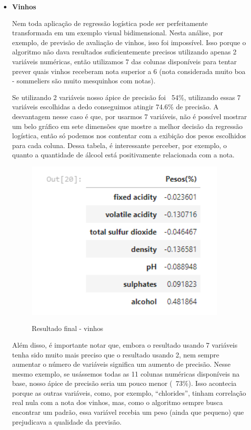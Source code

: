\documentclass[12pt]{article}
\begin{document}
\begin{itemize}
    \item \textbf{Vinhos}
    
    \hspace{0.4cm}Nem toda aplicação de regressão logística pode ser perfeitamente transformada em um exemplo visual bidimensional. Nesta análise, por exemplo, de previsão de avaliação de vinhos, isso foi impossível. Isso porque o algoritmo não dava resultados suficientemente precisos utilizando apenas 2 variáveis numéricas, então utilizamos 7 das colunas disponíveis para tentar prever quais vinhos receberam nota superior a 6 (nota considerada muito boa - sommeliers são muito mesquinhos com notas).

    \hspace{0.4cm}Se utilizando 2 variáveis nosso ápice de precisão foi ~54\%, utilizando essas 7 variáveis escolhidas a dedo conseguimos atingir 74.6\% de precisão. A desvantagem nesse caso é que, por usarmos 7 variáveis, não é possível mostrar um belo gráfico em sete dimensões que mostre a melhor decisão da regressão logística, então só podemos nos contentar com a exibição dos pesos escolhidos para cada coluna. Dessa tabela, é interessante perceber, por exemplo, o quanto a quantidade de álcool está positivamente relacionada com a nota.

    \begin{figure}[h]
    \caption{Resultado final - vinhos}
    \centering
    \includegraphics[width=10cm]{out3.png}
    \label{figura:out4}
    \end{figure}
    
    \hspace{0.4cm}Além disso, é importante notar que, embora o resultado usando 7 variáveis tenha sido muito mais preciso que o resultado usando 2, nem sempre aumentar o número de variáveis significa um aumento de precisão. Nesse mesmo exemplo, se usássemos todas as 11 colunas numéricas disponíveis na base, nosso ápice de precisão seria um pouco menor (~73\%). Isso acontecia porque as outras variáveis, como, por exemplo, “chlorides”, tinham correlação real nula com a nota dos vinhos, mas, como o algoritmo sempre busca encontrar um padrão, essa variável recebia um peso (ainda que pequeno) que prejudicava a qualidade da previsão.
	

\end{itemize}
\end{document}
